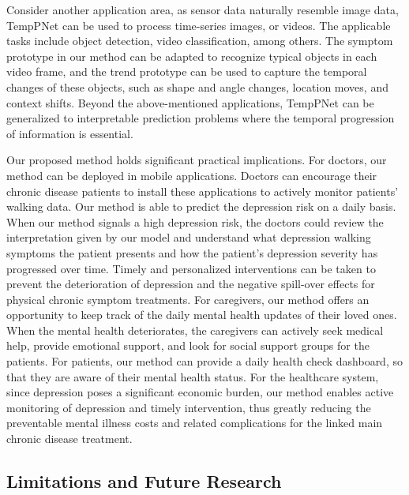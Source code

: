 \documentclass[mnsc]{informs3b} %
\begin{document}
Consider another application area, as sensor data naturally resemble image data, TempPNet can be used to process time-series images, or videos. The applicable tasks include object detection, video classification, among others. The symptom prototype in our method can be adapted to recognize typical objects in each video frame, and the trend prototype can be used to capture the temporal changes of these objects, such as shape and angle changes, location moves, and context shifts. Beyond the above-mentioned applications, TempPNet can be generalized to interpretable prediction problems where the temporal progression of information is essential.


Our proposed method holds significant practical implications. For doctors, our method can be deployed in mobile applications. Doctors can encourage their chronic disease patients to install these applications to actively monitor patients' walking data. Our method is able to predict the depression risk on a daily basis. When our method signals a high depression risk, the doctors could review the interpretation given by our model and understand what depression walking symptoms the patient presents and how the patient's depression severity has progressed over time. Timely and personalized interventions can be taken to prevent the deterioration of depression and the negative spill-over effects for physical chronic symptom treatments. For caregivers, our method offers an opportunity to keep track of the daily mental health updates of their loved ones. When the mental health deteriorates, the caregivers can actively seek medical help, provide emotional support, and look for social support groups for the patients. For patients, our method can provide a daily health check dashboard, so that they are aware of their mental health status. For the healthcare system, since depression poses a significant economic burden, our method enables active monitoring of depression and timely intervention, thus greatly reducing the preventable mental illness costs and related complications for the linked main chronic disease treatment.

\subsection{Limitations and Future Research}
\end{document}
